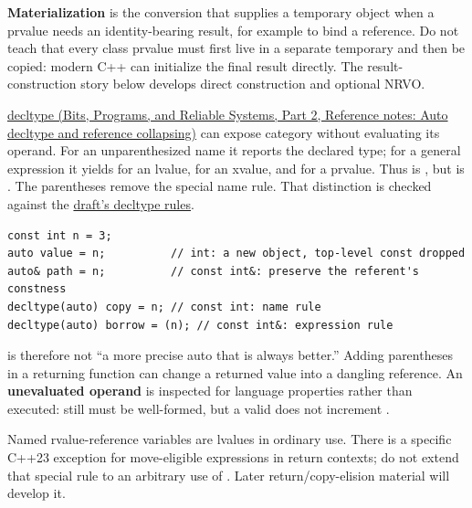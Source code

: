 \textbf{Materialization} is the conversion that supplies a temporary object when a prvalue needs an identity-bearing result, for example to bind a reference. Do not teach that every class prvalue must first live in a separate temporary and then be copied: modern C++ can initialize the final result directly. The result-construction story below develops direct construction and optional NRVO.

\href{../01-Bits-Programs-and-Reliable-Systems-P02/main.pdf\#appendix-5d4252a42886}{decltype (Bits, Programs, and Reliable Systems, Part 2, Reference notes: Auto decltype and reference collapsing)} can expose category without evaluating its operand. For an unparenthesized name it reports the declared type; for a general expression it yields  for an lvalue,  for an xvalue, and  for a prvalue. Thus  is , but  is . The parentheses remove the special name rule. That distinction is checked against the \href{https://eel.is/c++draft/dcl.type.decltype}{draft's decltype rules}.

\begin{verbatim}
const int n = 3;
auto value = n;          // int: a new object, top-level const dropped
auto& path = n;          // const int&: preserve the referent's constness
decltype(auto) copy = n; // const int: name rule
decltype(auto) borrow = (n); // const int&: expression rule
\end{verbatim}

 is therefore not ``a more precise auto that is always better.'' Adding parentheses in a returning function can change a returned value into a dangling reference. An \textbf{unevaluated operand} is inspected for language properties rather than executed:  still must be well-formed, but a valid  does not increment .

Named rvalue-reference variables are lvalues in ordinary use. There is a specific C++23 exception for move-eligible expressions in return contexts; do not extend that special rule to an arbitrary use of . Later return/copy-elision material will develop it.

